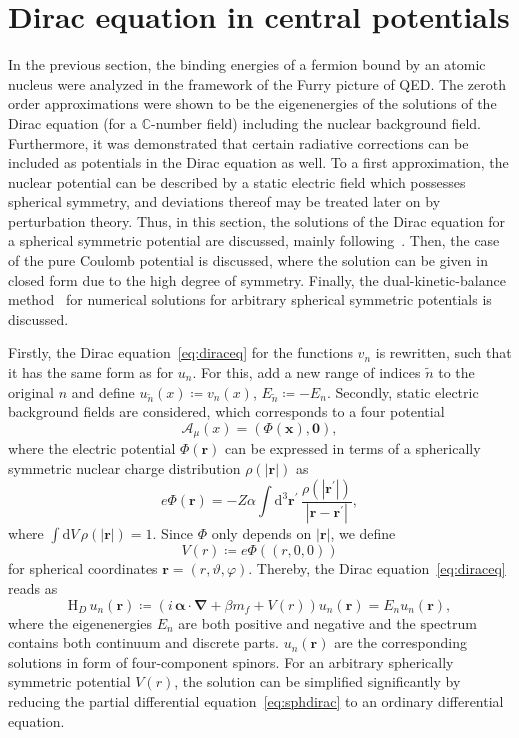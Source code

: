 \section{Dirac equation in central potentials}
\label{sec:sph_dirac}
In the previous section, the binding energies of a fermion bound by an atomic nucleus were analyzed in the framework of the Furry picture of QED. The zeroth order approximations were shown to be the eigenenergies of the solutions of the Dirac equation (for a \mbox{$\mathbb{C}$-number} field) including the nuclear background field. Furthermore, it was demonstrated that certain radiative corrections can be included as potentials in the Dirac equation as well. To a first approximation, the nuclear potential can be described by a static electric field which possesses spherical symmetry, and deviations thereof may be treated later on by perturbation theory. Thus, in this section, the solutions of the Dirac equation for a spherical symmetric potential are discussed, mainly following~\cite{greiner2000, weinberg2005}. Then, the case of the pure Coulomb potential is discussed, where the solution can be given in closed form due to the high degree of symmetry. Finally, the dual-kinetic-balance method~\cite{Shabaev2004} for numerical solutions for arbitrary spherical symmetric potentials is discussed.

Firstly, the Dirac equation~\eqref{eq:diraceq} for the functions $v_n$ is rewritten, such that it has the same form as for $u_n$. For this, add a new range of indices $\tilde{n}$ to the original $n$ and define $u_{\tilde{n}}(x)\coloneqq v_n(x)$, $E_{\tilde{n}}\coloneqq -E_n$. Secondly, static electric background fields are considered, which corresponds to a four potential
\begin{equation}
\mathcal{A}_\mu(x)=(\Phi(\mathbf{x}),\mathbf{0}),
\end{equation}
where the electric potential $\Phi(\mathbf{r})$ can be expressed in terms of a spherically symmetric nuclear charge distribution $\rho(\mathbf{|r|})$ as
\begin{equation}
\label{eq:furry_elPot}
e\Phi(\mathbf{r})=-Z\alpha\int\mathrm{d}^3\mathbf{r}^{\prime}\,\frac{\rho(|\mathbf{r^{\prime}}|)}{|\mathbf{r}-\mathbf{r^{\prime}}|},
\end{equation}
where $\int \mathrm{d}V\,\rho(|\mathbf{r}|)=1$. Since $\Phi$ only depends on $|\mathbf{r}|$, we define $$V(r)\coloneqq e\Phi((r,0,0))\label{eq:FSpot}$$ for spherical coordinates $\mathbf{r}=(r,\vartheta,\varphi)$. Thereby, the Dirac equation~\eqref{eq:diraceq} reads as
\begin{equation}
\text{H}_D \, u_n(\mathbf{r})\coloneqq\left( i\,\pmb{\alpha} \cdot \mathbf{\nabla} + \beta m_f + V(r) \right) u_n(\mathbf{r}) =  E_n u_n(\mathbf{r}),
\label{eq:sphdirac}
\end{equation}
where the eigenenergies $E_n$ are both positive and negative and the spectrum contains both continuum and discrete parts. $u_n(\mathbf{r})$ are the corresponding solutions in form of four-component spinors. For an arbitrary spherically symmetric potential $V(r)$, the solution can be simplified significantly by reducing the partial differential equation~\eqref{eq:sphdirac} to an ordinary differential equation.

